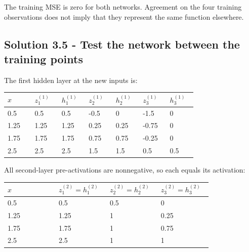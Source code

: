 \documentclass{course_sheet}
\begin{document}
The training MSE is zero for both networks. Agreement on the four
training observations does not imply that they represent the same
function elsewhere.

\subsection{Solution 3.5 - Test the network between the training points}

The first hidden layer at the new inputs is:

\begin{center}

\begingroup
\setlength{\tabcolsep}{3pt}
\small
\begin{tabular}{@{}p{0.128\linewidth}p{0.128\linewidth}p{0.128\linewidth}p{0.128\linewidth}p{0.128\linewidth}p{0.128\linewidth}p{0.128\linewidth}@{}}
\toprule
$x$ & $z^{(1)}_1$ & $h^{(1)}_1$ & $z^{(1)}_2$ & $h^{(1)}_2$ & $z^{(1)}_3$ & $h^{(1)}_3$ \\
\midrule
0.5 & 0.5 & 0.5 & -0.5 & 0 & -1.5 & 0 \\
1.25 & 1.25 & 1.25 & 0.25 & 0.25 & -0.75 & 0 \\
1.75 & 1.75 & 1.75 & 0.75 & 0.75 & -0.25 & 0 \\
2.5 & 2.5 & 2.5 & 1.5 & 1.5 & 0.5 & 0.5 \\
\bottomrule
\end{tabular}
\endgroup

\end{center}

All second-layer pre-activations are nonnegative, so each equals its
activation:

\begin{center}

\begingroup
\setlength{\tabcolsep}{3pt}
\begin{tabular}{@{}p{0.234\linewidth}p{0.234\linewidth}p{0.234\linewidth}p{0.234\linewidth}@{}}
\toprule
$x$ & $z^{(2)}_1=h^{(2)}_1$ & $z^{(2)}_2=h^{(2)}_2$ & $z^{(2)}_3=h^{(2)}_3$ \\
\midrule
0.5 & 0.5 & 0.5 & 0 \\
1.25 & 1.25 & 1 & 0.25 \\
1.75 & 1.75 & 1 & 0.75 \\
2.5 & 2.5 & 1 & 1 \\
\bottomrule
\end{tabular}
\endgroup

\end{center}
\end{document}
